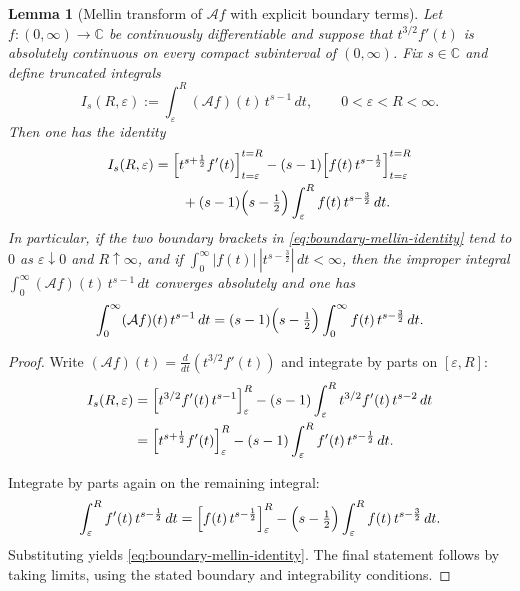 \documentclass[12pt]{amsart}
\newtheorem{lemma}[theorem]{Lemma}
\theoremstyle{definition}
\theoremstyle{remark}
\begin{document}
\begin{lemma}[Mellin transform of $\mathcal A f$ with explicit boundary terms]
\label{lem:boundary-mellin}
Let $f:(0,\infty)\to\mathbb C$ be continuously differentiable and suppose that
$t^{3/2}f'(t)$ is absolutely continuous on every compact subinterval of $(0,\infty)$.
Fix $s\in\mathbb C$ and define truncated integrals
\[
I_{s}(R,\varepsilon)
:=\int_{\varepsilon}^{R} (\mathcal A f)(t)\, t^{s-1}\,dt,
\qquad 0<\varepsilon<R<\infty.
\]
Then one has the identity
\begin{align}
\label{eq:boundary-mellin-identity}
I_s(R,\varepsilon)
&= \Bigl[t^{s+\frac12} f'(t)\Bigr]_{t=\varepsilon}^{t=R}
 -(s-1)\Bigl[f(t)\,t^{s-\frac12}\Bigr]_{t=\varepsilon}^{t=R} \nonumber\\
&\qquad
 +(s-1)\Bigl(s-\tfrac12\Bigr)
 \int_{\varepsilon}^{R} f(t)\,t^{s-\frac32}\,dt.
\end{align}
In particular, if the two boundary brackets in \eqref{eq:boundary-mellin-identity}
tend to $0$ as $\varepsilon\downarrow 0$ and $R\uparrow\infty$, and if
$\int_{0}^{\infty} |f(t)|\,|t^{s-\frac32}|\,dt<\infty$, then the improper integral
$\int_{0}^{\infty} (\mathcal A f)(t)\, t^{s-1}\,dt$ converges absolutely and one has
\begin{equation}
\label{eq:boundary-free-mellin}
\int_{0}^{\infty} (\mathcal A f)(t)\, t^{s-1}\,dt
=
(s-1)\Bigl(s-\tfrac12\Bigr)\int_{0}^{\infty} f(t)\,t^{s-\frac32}\,dt.
\end{equation}
\end{lemma}

\begin{proof}
Write $(\mathcal A f)(t)=\frac{d}{dt}(t^{3/2}f'(t))$ and integrate by parts on
$[\varepsilon,R]$:
\begin{align*}
I_s(R,\varepsilon)
&= \Bigl[t^{3/2}f'(t)\,t^{s-1}\Bigr]_{\varepsilon}^{R}
 -(s-1)\int_{\varepsilon}^{R} t^{3/2}f'(t)\,t^{s-2}\,dt \\
&= \Bigl[t^{s+\frac12} f'(t)\Bigr]_{\varepsilon}^{R}
 -(s-1)\int_{\varepsilon}^{R} f'(t)\,t^{s-\frac12}\,dt.
\end{align*}

Integrate by parts again on the remaining integral:
\[
\int_{\varepsilon}^{R} f'(t)\,t^{s-\frac12}\,dt
=
\Bigl[f(t)\,t^{s-\frac12}\Bigr]_{\varepsilon}^{R}
-\Bigl(s-\tfrac12\Bigr)\int_{\varepsilon}^{R} f(t)\,t^{s-\frac32}\,dt.
\]
Substituting yields \eqref{eq:boundary-mellin-identity}. The final statement
follows by taking limits, using the stated boundary and integrability conditions.
\end{proof}
\end{document}
